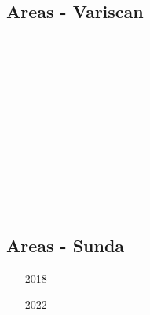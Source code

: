 \subsection{Areas - Variscan}

\begin{scriptsize}
\begin{itemize}
\item[\nineteenninetynine] 
\textcite{vajh99} \\
\item[\twothousandfour] 
\textcite{fijj04}  \\
\item[\twothousandseven] 
\textcite{masp07}  \\
\item[\twothousandthirteen] 
\textcite{rems13}  \\
\item[\twothousandseventeen] 
\textcite{regorda}  \\
\item[\twothousandeighteen] 
\textcite{gesr18}  \\
\item[\twothousandtwenty] 
\textcite{relr20} \\
\item[\twothousandtwentyone] 
\textcite{mass21} 
\end{itemize}
\end{scriptsize}


\subsection{Areas - Sunda}

\begin{scriptsize}
\begin{itemize}
\item[2018]
\textcite{racr18} 
\item[2022]
\textcite{zugc22} 
\end{itemize}
\end{scriptsize}



